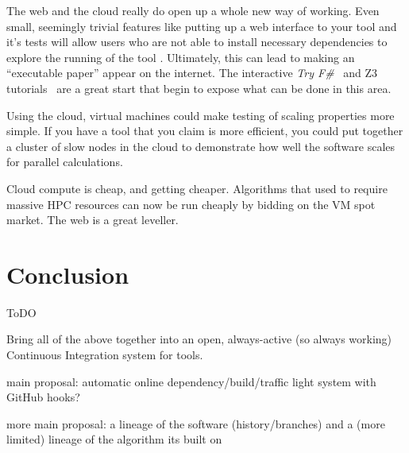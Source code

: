 \documentclass[conference]{IEEEtran}
\begin{document}
The web and the cloud really do open up a whole new way of
working. Even small, seemingly trivial features like putting up a web
interface to your tool and it's tests will allow users who are not
able to install necessary dependencies to explore the running of the
tool \cite{Hall2014}. Ultimately, this can lead to making an
``executable paper'' appear on the internet. The interactive {\em Try
  F\#}~\cite{tryFsharp} and Z3 tutorials~\cite{Z3tutorial} are a great
start that begin to expose what can be done in this area.

Using the cloud, virtual machines could make testing of scaling
properties more simple.  If you have a tool that you claim is more
efficient, you could put together a cluster of slow nodes in the cloud
to demonstrate how well the software scales for parallel calculations.

Cloud compute is cheap, and getting cheaper. Algorithms that used to
require massive HPC resources can now be run cheaply by bidding on
the VM spot market. The web is a great leveller. 


\section{Conclusion}
\label{sec:Conclusion} 

ToDO 

Bring all of the above together into an open, always-active (so always
working) Continuous Integration system for tools. 

main proposal: automatic online dependency/build/traffic light system
with GitHub hooks?

more main proposal: a lineage of the software (history/branches) and a
(more limited) lineage of the algorithm its built on





\end{document}
